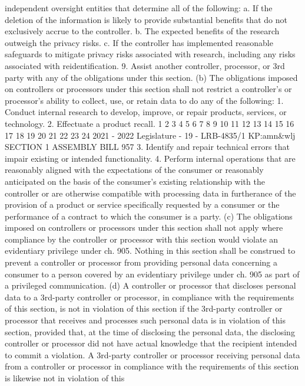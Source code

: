independent oversight entities that determine all of the following:
a. If the deletion of the information is likely to provide substantial benefits that
do not exclusively accrue to the controller.
b. The expected benefits of the research outweigh the privacy risks.
c. If the controller has implemented reasonable safeguards to mitigate privacy
risks associated with research, including any risks associated with reidentification.
9. Assist another controller, processor, or 3rd party with any of the obligations
under this section.
(b) The obligations imposed on controllers or processors under this section shall
not restrict a controller's or processor's ability to collect, use, or retain data to do any
of the following:
1. Conduct internal research to develop, improve, or repair products, services,
or technology.
2. Effectuate a product recall.
1
2
3
4
5
6
7
8
9
10
11
12
13
14
15
16
17
18
19
20
21
22
23
24
2021 - 2022 Legislature - 19 - LRB-4835/1
KP:amn&wlj
SECTION 1 ASSEMBLY BILL 957
3. Identify and repair technical errors that impair existing or intended
functionality.
4. Perform internal operations that are reasonably aligned with the
expectations of the consumer or reasonably anticipated on the basis of the
consumer's existing relationship with the controller or are otherwise compatible
with processing data in furtherance of the provision of a product or service
specifically requested by a consumer or the performance of a contract to which the
consumer is a party.
(c) The obligations imposed on controllers or processors under this section shall
not apply where compliance by the controller or processor with this section would
violate an evidentiary privilege under ch. 905. Nothing in this section shall be
construed to prevent a controller or processor from providing personal data
concerning a consumer to a person covered by an evidentiary privilege under ch. 905
as part of a privileged communication.
(d) A controller or processor that discloses personal data to a 3rd-party
controller or processor, in compliance with the requirements of this section, is not in
violation of this section if the 3rd-party controller or processor that receives and
processes such personal data is in violation of this section, provided that, at the time
of disclosing the personal data, the disclosing controller or processor did not have
actual knowledge that the recipient intended to commit a violation. A 3rd-party
controller or processor receiving personal data from a controller or processor in
compliance with the requirements of this section is likewise not in violation of this
